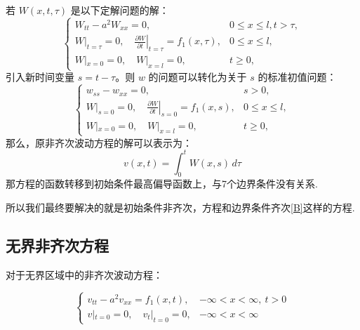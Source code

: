 \documentclass[12pt,a4paper]{article}
\numberwithin{subsection}{section}
\numberwithin{subsubsection}{subsection}
\theoremstyle{plain}
\theoremstyle{definition}
\theoremstyle{remark}
\begin{document}
	若 \( W(x, t, \tau) \) 是以下定解问题的解：
\begin{equation}
	\begin{cases}
		W_{tt} - a^2 W_{xx} = 0, & 0 \leq x \leq l, t > \tau, \\
	W|_{t=\tau} = 0, \quad \left. \frac{\partial W}{\partial t} \right|_{t=\tau} = f_1(x, \tau), & 0 \leq x \leq l,\\
	W|_{x=0} = 0, \quad W|_{x=l} = 0, & t \geq 0,
	\end{cases}
\end{equation}	
	引入新时间变量 $s = t-\tau$。则 $w$ 的问题可以转化为关于 $s$ 的标准初值问题：
	\begin{equation}
	\begin{cases}
		w_{ss} - w_{xx} = 0, & s > 0, \\
		W|_{s=0} = 0, \quad \left. \frac{\partial W}{\partial t} \right|_{s=0} = f_1(x, s), & 0 \leq x \leq l,\\
	W|_{x=0} = 0, \quad W|_{x=l} = 0, & t \geq 0,
	\end{cases}
\end{equation}	
		那么，原非齐次波动方程的解可以表示为：
	\begin{equation}
		v(x, t) = \int_0^t W(x, s) \, d\tau
	\end{equation}
	那方程的函数转移到初始条件最高偏导函数上，与7个边界条件没有关系.

所以我们最终要解决的就是初始条件非齐次，方程和边界条件齐次\eqref{B}这样的方程.
	
	
	

	\subsection{无界非齐次方程}
	对于无界区域中的非齐次波动方程：
	
\begin{equation}
	\begin{cases}
		v_{tt} - a^2 v_{xx} = f_1(x, t), & -\infty < x < \infty, \ t > 0 \\
		v|_{t=0} = 0, \quad v_t|_{t=0} = 0, & -\infty < x < \infty
	\end{cases}
\end{equation}
	
\end{document}
